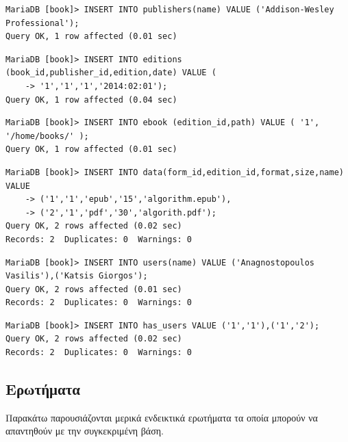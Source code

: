 \documentclass{assignment}
\begin{document}
\begin{verbatim}
MariaDB [book]> INSERT INTO publishers(name) VALUE ('Addison-Wesley Professional');
Query OK, 1 row affected (0.01 sec)
\end{verbatim}

\begin{verbatim}
MariaDB [book]> INSERT INTO editions (book_id,publisher_id,edition,date) VALUE (
    -> '1','1','1','2014:02:01');
Query OK, 1 row affected (0.04 sec)
\end{verbatim}

\begin{verbatim}
MariaDB [book]> INSERT INTO ebook (edition_id,path) VALUE ( '1', '/home/books/' );
Query OK, 1 row affected (0.01 sec)
\end{verbatim}

\begin{verbatim}
MariaDB [book]> INSERT INTO data(form_id,edition_id,format,size,name) VALUE
    -> ('1','1','epub','15','algorithm.epub'),
    -> ('2','1','pdf','30','algorith.pdf');
Query OK, 2 rows affected (0.02 sec)
Records: 2  Duplicates: 0  Warnings: 0
\end{verbatim}

\begin{verbatim}
MariaDB [book]> INSERT INTO users(name) VALUE ('Anagnostopoulos Vasilis'),('Katsis Giorgos');
Query OK, 2 rows affected (0.01 sec)
Records: 2  Duplicates: 0  Warnings: 0
\end{verbatim}

\begin{verbatim}
MariaDB [book]> INSERT INTO has_users VALUE ('1','1'),('1','2');
Query OK, 2 rows affected (0.02 sec)
Records: 2  Duplicates: 0  Warnings: 0
\end{verbatim}

\subsection{Ερωτήματα}

Παρακάτω παρουσιάζονται μερικά ενδεικτικά ερωτήματα τα οποία μπορούν να απαντηθούν με την συγκεκριμένη βάση.
\end{document}
